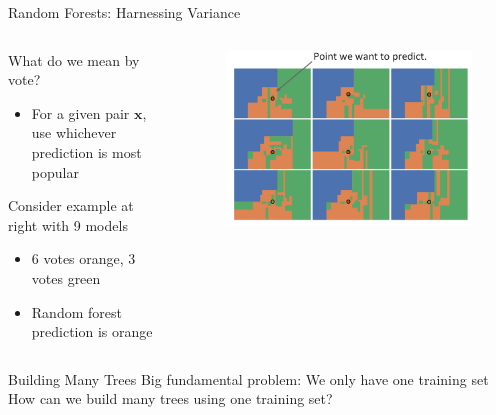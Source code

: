 \documentclass[aspectratio=169]{../latex_main/tntbeamer}  %
\begin{document}
	
	\begin{frame}[c]{Random Forests: Harnessing Variance}
	    \begin{columns}
	        \begin{column}{.5\textwidth}
	                What do we mean by vote?
	                \begin{itemize}
	                    \item For a given pair $\bm{x}$, use whichever prediction is most popular
	                \end{itemize}
	                
	                Consider example at right with 9 models
	                \begin{itemize}
	                    \item 6 votes orange, 3 votes green 
	                    \item Random forest prediction is orange
	                \end{itemize}
	        \end{column}
	        
	        \begin{column}{.5\textwidth}
	                \begin{figure}
	                    \centering
	                    \includegraphics[scale=.35]{Bild56}
	                \end{figure}
	        \end{column}
	    \end{columns}
	\end{frame}
	
	\begin{frame}[c]{Building Many Trees}
	    Big fundamental problem: We only have one training set\\
	    \bigskip
	    How can we build many trees using one training set?

	\end{frame}
	
\end{document}
